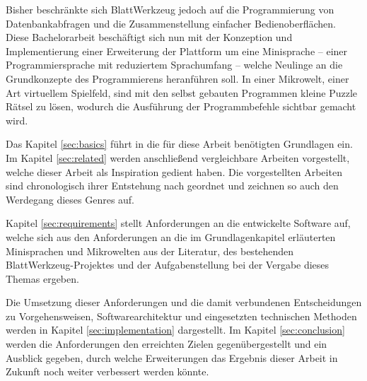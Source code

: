 Bisher beschränkte sich BlattWerkzeug jedoch auf die Programmierung von Datenbankabfragen und die Zusammenstellung einfacher Bedienoberflächen. Diese Bachelorarbeit beschäftigt sich nun mit der Konzeption und Implementierung einer Erweiterung der Plattform um eine Minisprache -- einer Programmiersprache mit reduziertem Sprachumfang -- welche Neulinge an die Grundkonzepte des Programmierens heranführen soll. In einer Mikrowelt, einer Art virtuellem Spielfeld, sind mit den selbst gebauten Programmen kleine Puzzle Rätsel zu lösen, wodurch die Ausführung der Programmbefehle sichtbar gemacht wird.

Das Kapitel \ref{sec:basics} führt in die für diese Arbeit benötigten Grundlagen ein. Im Kapitel \ref{sec:related} werden anschließend vergleichbare Arbeiten vorgestellt, welche dieser Arbeit als Inspiration gedient haben. Die vorgestellten Arbeiten sind chronologisch ihrer Entstehung nach geordnet und zeichnen so auch den Werdegang dieses Genres auf.

Kapitel \ref{sec:requirements} stellt Anforderungen an die entwickelte Software auf, welche sich aus den Anforderungen an die im Grundlagenkapitel erläuterten Minisprachen und Mikrowelten aus der Literatur, des bestehenden BlattWerkzeug-Projektes und der Aufgabenstellung bei der Vergabe dieses Themas ergeben.

Die Umsetzung dieser Anforderungen und die damit verbundenen Entscheidungen zu Vorgehensweisen, Softwarearchitektur und eingesetzten technischen Methoden werden in Kapitel \ref{sec:implementation} dargestellt. Im Kapitel \ref{sec:conclusion} werden die Anforderungen den erreichten Zielen gegenübergestellt und ein Ausblick gegeben, durch welche Erweiterungen das Ergebnis dieser Arbeit in Zukunft noch weiter verbessert werden könnte.

